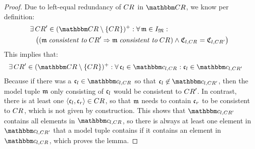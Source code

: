 \begin{proof}
    Due to left-equal redundancy of $\consistencyrelation{CR}{}$ in $\consistencyrelationset{CR}$, we know per definition:
    \begin{align*}
        &
        \exists \consistencyrelation{CR}{}' \in \transitiveclosure{(\consistencyrelationset{CR} \setminus \setted{\consistencyrelation{CR}{}})} :
        \forall \modeltuple{m} \in \metamodeltupleinstanceset{M} : \\
        & \formulaskip
        \big(
            (
                \modeltuple{m} \consistenttomath \consistencyrelation{CR}{}' \Rightarrow \modeltuple{m} \consistenttomath \consistencyrelation{CR}{} 
            )
            \land 
            \classtuple{C}{l,\consistencyrelation{CR}{}} = \classtuple{C}{l,\consistencyrelation{CR}{}'} 
        \big)
    \end{align*}
    This implies that:
    \begin{align*}
        &
        \exists \consistencyrelation{CR}{}' \in \transitiveclosure{(\consistencyrelationset{CR} \setminus \setted{\consistencyrelation{CR}{}})} :
        \forall \conditionelement{c}{l} \in \condition{c}{l,\consistencyrelation{CR}{}} :
        \conditionelement{c}{l} \in \condition{c}{l,\consistencyrelation{CR}{}'}
    \end{align*}
    Because if there was a $\conditionelement{c}{l} \in \condition{c}{l,\consistencyrelation{CR}{}}$ so that $\conditionelement{c}{l} \not\in \condition{c}{l,\consistencyrelation{CR}{}'}$, then the model tuple $\modeltuple{m}$ only consisting of $\conditionelement{c}{l}$ would be consistent to $\consistencyrelation{CR}{}'$.
    In contrast, there is at least one $\tupled{\conditionelement{c}{l}, \conditionelement{c}{r}} \in \consistencyrelation{CR}{}$, so that $\modeltuple{m}$ needs to contain $\conditionelement{c}{r}$ to be consistent to $\consistencyrelation{CR}{}$, which is not given by construction.
    This shows that $\condition{c}{l,\consistencyrelation{CR}{}'}$ contains all elements in $\condition{c}{l,\consistencyrelation{CR}{}}$, so there is always at least one element in $\condition{c}{l,\consistencyrelation{CR}{}'}$ that a model tuple contains if it contains an element in $\condition{c}{l,\consistencyrelation{CR}{}}$, which proves the lemma.
\end{proof}

